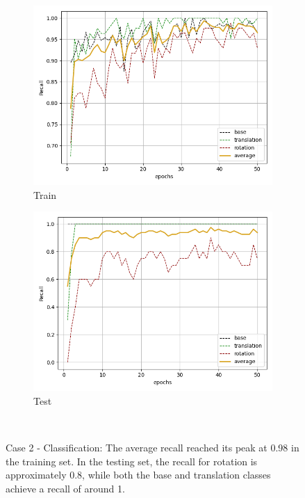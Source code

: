 \begin{figure}[H]
    \begin{subfigure}{.48\linewidth}
    \centering
    \includegraphics[scale=0.45]{Img/cls_noise_train_rec.png}
    \caption{Train}
    \end{subfigure}
    \begin{subfigure}{.48\linewidth}
    \centering
    \includegraphics[scale=0.45]{Img/cls_noise_test_rec.png}
    \caption{Test}
    \end{subfigure}\\
    \caption{Case 2 - Classification: The average recall reached its peak at 0.98 in the training set. In the testing set, the recall for rotation is approximately 0.8, while both the base and translation classes achieve a recall of around 1.  }
    \label{fig:cls_noise_rec}
\end{figure}
